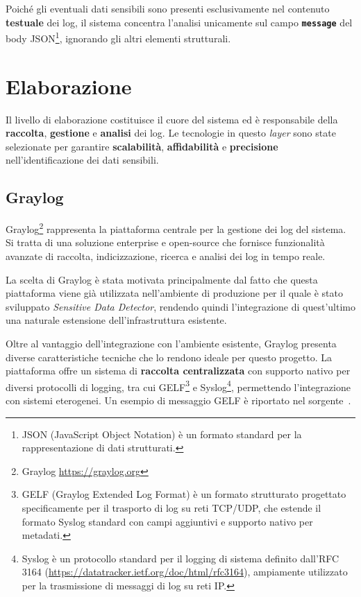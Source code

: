 \documentclass[12pt,twoside]{report}
\begin{document}
Poiché gli eventuali dati sensibili sono presenti esclusivamente nel contenuto \textbf{testuale} dei log, il sistema concentra l'analisi unicamente sul campo \textbf{\texttt{message}} del body JSON\footnote{JSON (JavaScript Object Notation) è un formato standard per la rappresentazione di dati strutturati.}, ignorando gli altri elementi strutturali.

\section{Elaborazione}
\label{sec:elaborazione_log}

Il livello di elaborazione costituisce il cuore del sistema ed è responsabile della \textbf{raccolta}, \textbf{gestione} e \textbf{analisi} dei log. Le tecnologie in questo \textit{layer} sono state selezionate per garantire \textbf{scalabilità}, \textbf{affidabilità} e \textbf{precisione} nell'identificazione dei dati sensibili.

\subsection{Graylog}
\label{subsec:graylog}

Graylog\footnote{Graylog \url{https://graylog.org}} rappresenta la piattaforma centrale per la gestione dei log del sistema.\\
Si tratta di una soluzione enterprise e open-source che fornisce funzionalità avanzate di raccolta, indicizzazione, ricerca e analisi dei log in tempo reale.

La scelta di Graylog è stata motivata principalmente dal fatto che questa piattaforma viene già utilizzata nell'ambiente di produzione per il quale è stato sviluppato \textit{Sensitive Data Detector}, rendendo quindi l'integrazione di quest'ultimo una naturale estensione dell'infrastruttura esistente.

Oltre al vantaggio dell'integrazione con l'ambiente esistente, Graylog presenta diverse caratteristiche tecniche che lo rendono ideale per questo progetto. La piattaforma offre un sistema di \textbf{raccolta centralizzata} con supporto nativo per diversi protocolli di logging, tra cui GELF\footnote{GELF (Graylog Extended Log Format) è un formato strutturato progettato specificamente per il trasporto di log su reti TCP/UDP, che estende il formato Syslog standard con campi aggiuntivi e supporto nativo per metadati.} e Syslog\footnote{Syslog è un protocollo standard per il logging di sistema definito dall'RFC 3164 (\url{https://datatracker.ietf.org/doc/html/rfc3164}), ampiamente utilizzato per la trasmissione di messaggi di log su reti IP.}, permettendo l'integrazione con sistemi eterogenei. Un esempio di messaggio GELF è riportato nel sorgente~.
\end{document}
